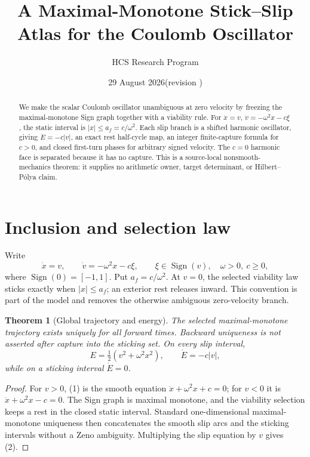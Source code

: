 \documentclass[10pt]{article}
\title{A Maximal-Monotone Stick--Slip Atlas for the Coulomb Oscillator}
\author{HCS Research Program}
\date{29 August 2026\quad (revision \CRevisionRound)}
\newtheorem{theorem}{Theorem}
\begin{document}
\maketitle
\begin{abstract}
We make the scalar Coulomb oscillator unambiguous at zero velocity by freezing
the maximal-monotone Sign graph together with a viability rule.  For
\(\dot x=v\), \(\dot v=-\omega^2x-c\xi\), the static interval is
\(|x|\le a_f=c/\omega^2\).  Each slip branch is a shifted harmonic
oscillator, giving \(\dot E=-c|v|\), an exact rest half-cycle map, an integer
finite-capture formula for \(c>0\), and closed first-turn phases for arbitrary signed
velocity.  The \(c=0\) harmonic face is separated because it has no capture.
This is a source-local nonsmooth-mechanics theorem: it supplies no arithmetic
owner, target determinant, or Hilbert--Pólya claim.
\end{abstract}

\section{Inclusion and selection law}
Write
\begin{equation}
 \dot x=v,\qquad \dot v=-\omega^2x-c\xi,
 \qquad \xi\in\operatorname{Sign}(v),\quad \omega>0,\ c\ge0, \tag{1}
\end{equation}
where \(\operatorname{Sign}(0)=[-1,1]\).  Put
\(a_f=c/\omega^2\).  At \(v=0\), the selected viability law sticks exactly
when \(|x|\le a_f\); an exterior rest releases inward.  This convention is
part of the model and removes the otherwise ambiguous zero-velocity branch.

\begin{theorem}[Global trajectory and energy]
The selected maximal-monotone trajectory exists uniquely for all forward
times.  Backward uniqueness is not asserted after capture into the sticking
set.  On every slip interval,
\[
 E=\tfrac12(v^2+\omega^2x^2),\qquad \dot E=-c|v|, \tag{2}
\]
while on a sticking interval \(\dot E=0\).
\end{theorem}
\begin{proof}
For \(v>0\), (1) is the smooth equation
\(\ddot x+\omega^2x+c=0\); for \(v<0\) it is
\(\ddot x+\omega^2x-c=0\).  The Sign graph is maximal monotone, and the
viability selection keeps a rest in the closed static interval.  Standard
one-dimensional maximal-monotone uniqueness then concatenates the smooth
slip arcs and the sticking intervals without a Zeno ambiguity.  Multiplying
the slip equation by \(v\) gives (2).
\end{proof}
\end{document}

